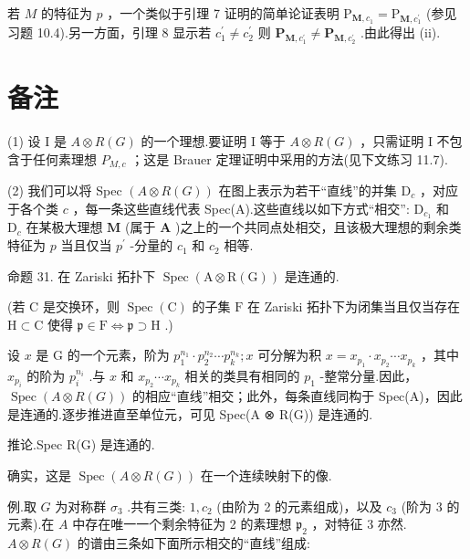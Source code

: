 \documentclass[10pt]{article}
\begin{document}
若 \(M\) 的特征为 \(p\) ，一个类似于引理 7 证明的简单论证表明 \({\mathrm{P}}_{\mathbf{M},{c}_{1}} = {\mathrm{P}}_{\mathbf{M},{c}_{1}^{\prime }}\) (参见习题 10.4).另一方面，引理 8 显示若 \({c}_{1}^{\prime } \neq  {c}_{2}^{\prime }\) 则 \({\mathbf{P}}_{\mathbf{M},{c}_{1}^{\prime }} \neq  {\mathbf{P}}_{\mathbf{M},{c}_{2}^{\prime }}\) .由此得出 (ii).

\section*{备注}

(1) 设 I 是 \(A \otimes  R\left( G\right)\) 的一个理想.要证明 I 等于 \(A \otimes  R\left( G\right)\) ，只需证明 I 不包含于任何素理想 \({P}_{M,c}\) ；这是 Brauer 定理证明中采用的方法(见下文练习 11.7).

(2) 我们可以将 Spec \(\left( {A \otimes  R\left( G\right) }\right)\) 在图上表示为若干“直线”的并集 \({\mathrm{D}}_{c}\) ，对应于各个类 \(c\) ，每一条这些直线代表 Spec(A).这些直线以如下方式“相交”: \({\mathrm{D}}_{{c}_{1}}\) 和 \({\mathrm{D}}_{c}\) 在某极大理想 \(\mathbf{M}\) (属于 \(\mathbf{A}\) )之上的一个共同点处相交，且该极大理想的剩余类特征为 \(p\) 当且仅当 \({p}^{\prime }\) -分量的 \({c}_{1}\) 和 \({c}_{2}\) 相等.

命题 31. 在 Zariski 拓扑下 \(\operatorname{Spec}\left( {\mathrm{A} \otimes  \mathrm{R}\left( \mathrm{G}\right) }\right)\) 是连通的.

(若 \(\mathrm{C}\) 是交换环，则 \(\operatorname{Spec}\left( \mathrm{C}\right)\) 的子集 \(\mathrm{F}\) 在 Zariski 拓扑下为闭集当且仅当存在 \(\mathrm{H} \subset  \mathrm{C}\) 使得 \(\mathfrak{p} \in  \mathrm{F} \Leftrightarrow  \mathfrak{p} \supset  \mathrm{H}\) .)

设 \(x\) 是 \(\mathrm{G}\) 的一个元素，阶为 \({p}_{1}^{{n}_{1}} \cdot  {p}_{2}^{{n}_{2}}\cdots {p}_{k}^{{n}_{k}};x\) 可分解为积 \(x = {x}_{{p}_{1}} \cdot  {x}_{{p}_{2}}\cdots {x}_{{p}_{k}}\) ，其中 \({x}_{{p}_{i}}\) 的阶为 \({p}_{i}^{{n}_{i}}\) .与 \(x\) 和 \({x}_{{p}_{2}}\cdots {x}_{{p}_{k}}\) 相关的类具有相同的 \({p}_{1}\) -整常分量.因此， \(\operatorname{Spec}\left( {A \otimes  R\left( G\right) }\right)\) 的相应“直线”相交；此外，每条直线同构于 Spec(A)，因此是连通的.逐步推进直至单位元，可见 Spec(A ⊗ R(G)) 是连通的.

推论.Spec R(G) 是连通的.

确实，这是 \(\operatorname{Spec}\left( {A \otimes  R\left( G\right) }\right)\) 在一个连续映射下的像.

例.取 \(G\) 为对称群 \({\sigma }_{3}\) .共有三类: \(1,{c}_{2}\) (由阶为 2 的元素组成)，以及 \({c}_{3}\) (阶为 3 的元素).在 \(A\) 中存在唯一一个剩余特征为 2 的素理想 \({\mathfrak{p}}_{2}\) ，对特征 3 亦然. \(A \otimes  R\left( G\right)\) 的谱由三条如下面所示相交的“直线”组成:
\end{document}
